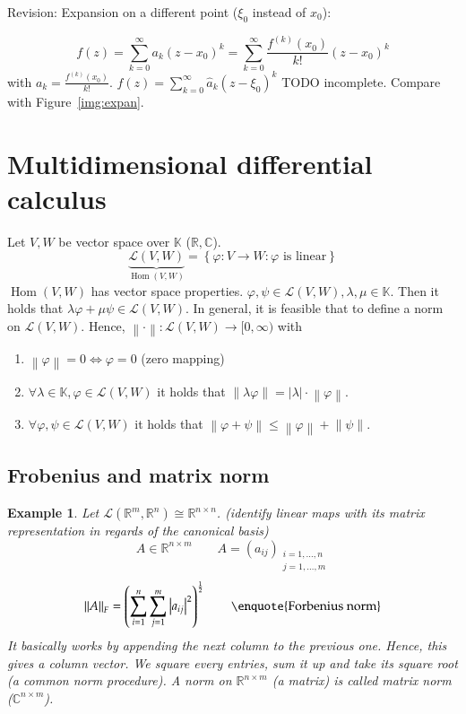 \documentclass{article}
\newtheorem{example}{Example}  \numberwithin{example}{section}
\newcommand{\set}[1]{\left\{#1\right\}}
\newcommand{\norm}[1]{\left\|#1\right\|}
\newcommand{\card}[1]{\left|#1\right|}
\begin{document}
Revision: Expansion on a different point ($\xi_0$ instead of $x_0$):

\[ f(z) = \sum_{k=0}^\infty a_k (z - x_0)^k = \sum_{k=0}^\infty \frac{f^{(k)}(x_0)}{k!} (z - x_0)^k \]
with $a_k = \frac{f^{(k)}(x_0)}{k!}$. $f(z) = \sum_{k=0}^\infty \hat a_k(z - \xi_0)^k$ TODO incomplete.
Compare with Figure~\ref{img:expan}.

\section{Multidimensional differential calculus} %

Let $V,W$ be vector space over $\mathbb K$ ($\mathbb R, \mathbb C$).
\[ \underbrace{\mathcal L(V, W)}_{\operatorname{Hom}(V, W)} = \set{\varphi: V \to W: \varphi \text{ is linear}} \]
$\operatorname{Hom}(V, W)$ has vector space properties.
$\varphi, \psi \in \mathcal L(V, W), \lambda, \mu \in \mathbb K$.
Then it holds that $\lambda \varphi + \mu \psi \in \mathcal L(V, W)$.
In general, it is feasible that to define a norm on $\mathcal L(V, W)$.
Hence, $\norm{\cdot}: \mathcal L(V, W) \to [0, \infty)$ with
\begin{enumerate}
  \item $\norm{\varphi} = 0 \iff \varphi = 0$ (zero mapping)
  \item $\forall \lambda \in \mathbb K, \varphi \in \mathcal L(V, W)$ it holds that $\norm{\lambda \varphi} = \card{\lambda} \cdot \norm{\varphi}$.
  \item $\forall \varphi, \psi \in \mathcal L(V, W)$ it holds that $\norm{\varphi + \psi} \leq \norm{\varphi} + \norm{\psi}$.
\end{enumerate}

\subsection{Frobenius and matrix norm}

\begin{example}
  Let $\mathcal L(\mathbb R^m, \mathbb R^n) \cong \mathbb R^{n \times n}$.
  (identify linear maps with its matrix representation in regards of the canonical basis)
  \[ A \in \mathbb R^{n \times m} \qquad A = (a_{ij})_{\substack{i=1,\dots,n \\ j=1,\dots,m}} \]
  \[ \norm{A}_F = \left(\sum_{i=1}^n \sum_{j=1}^m \card{a_{ij}}^2\right)^{\frac12} \qquad \text{\enquote{Forbenius norm}} \]
  It basically works by appending the next column to the previous one. Hence, this gives a column vector. We square every entries, sum it up and take its square root (a common norm procedure).
  A norm on $\mathbb R^{n \times m}$ (a matrix) is called \emph{matrix norm} ($\mathbb C^{n \times m}$).
\end{example}
\end{document}
